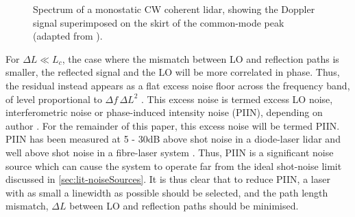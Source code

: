     \begin{figure}[H]
    \centering
    \caption{Spectrum of a monostatic CW coherent lidar, showing the Doppler
    signal superimposed on the skirt of the common-mode peak (adapted from \cite{cariou2006laser}).}
    \label{fig:commonmode}
    \end{figure}

    For $\Delta L \ll L_c$, the case where the mismatch between LO and reflection paths is smaller, the reflected signal and the LO will be more correlated in phase.
    Thus, the residual instead appears as a flat excess noise floor across the
    frequency band, of level proportional to $\Delta f\,\Delta L^{2}$
    \cite{harris_role_1998}. This excess noise is termed excess LO noise,
    interferometric noise or phase-induced intensity noise (PIIN), depending on author
    \cite{harris_role_1998,abari_all-fiber_2014,jiang_performance_2019}. For the remainder of this paper, this excess noise will be termed PIIN. PIIN has
    been measured at 5 - 30dB above shot noise in a diode-laser
    lidar \cite{harris_role_1998} and well above shot noise in a fibre-laser
    system \cite{jiang_performance_2019}. Thus, PIIN is a significant noise source which can cause the system to operate far from the ideal shot-noise limit discussed in \autoref{sec:lit-noiseSources}. It is thus clear that to reduce PIIN, a laser with as small a linewidth as possible should be selected, and the path length mismatch, $\Delta L$ between LO and reflection paths should be minimised.

